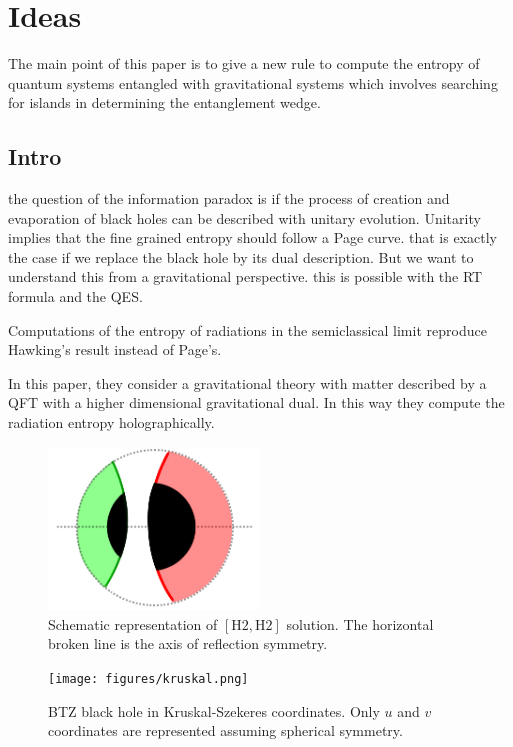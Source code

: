 \section{Ideas}

The main point of this paper is to give a new rule to compute the entropy of quantum systems entangled with gravitational systems which involves searching for islands in determining the entanglement wedge.

\subsection{Intro}

the question of the information paradox is if the process of creation and evaporation of black holes can be described with unitary evolution. Unitarity implies that the fine grained entropy should follow a Page curve. that is exactly the case if we replace the black hole by its dual description. But we want to understand this from a gravitational perspective. this is possible with the RT formula and the QES.

Computations of the entropy of radiations in the semiclassical limit reproduce Hawking's result instead of Page's. 

In this paper, they consider a gravitational theory with matter described by a QFT with a higher dimensional gravitational dual. In this way they compute the radiation entropy holographically.


\begin{figure}
    \centering
    \includegraphics[width=0.5\textwidth]{figures/sigmasym.png}
    \caption{Schematic representation of $\left[\text{H}2,\text{H}2\right]$ solution. The horizontal broken line is the axis of reflection symmetry.}
    \label{symmetric geometry}
\end{figure}

\begin{figure}
    \centering
    \texttt{[image: figures/kruskal.png]}
    \caption{BTZ black hole in Kruskal-Szekeres coordinates. Only $u$ and $v$ coordinates are represented assuming spherical symmetry.}
    \label{Kruskal BTZ}
\end{figure}
